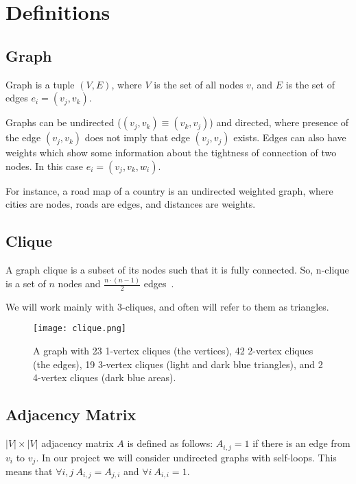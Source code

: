\section{Definitions}

\subsection*{Graph}

Graph is a tuple $\left( V, E \right)$, where $V$ is the set of all nodes $v$, and $E$ is the set of edges $e_i = (v_j, v_k)$.

Graphs can be undirected ($(v_j, v_k) \equiv (v_k, v_j)$) and directed, where presence of the edge $(v_j, v_k)$ does not imply that edge $(v_j, v_j)$ exists.
Edges can also have weights which show some information about the tightness of connection of two nodes.
In this case $e_i = (v_j, v_k, w_i)$.

For instance, a road map of a country is an undirected weighted graph, where cities are nodes, roads are edges, and distances are weights.


\subsection*{Clique}

A graph clique is a subset of its nodes such that it is fully connected.
So, n-clique is a set of $n$ nodes and $\frac{n \cdot (n - 1)}{2}$ edges~\cite{wiki_clique}.

We will work mainly with 3-cliques, and often will refer to them as triangles.

\begin{figure}[H]
	\centering
	\texttt{[image: clique.png]}
	\caption{A graph with 23 1-vertex cliques (the vertices), 42 2-vertex cliques (the edges), 19 3-vertex cliques (light and dark blue triangles), and 2 4-vertex cliques (dark blue areas).}
\end{figure}


\subsection*{Adjacency Matrix}

$\lvert V \rvert \times \lvert V \rvert$ adjacency matrix $A$ is defined as follows: $A_{i, j} = 1$ if there is an edge from $v_i$ to $v_j$.
In our project we will consider undirected graphs with self-loops.
This means that $\forall i, j\ A_{i, j} = A_{j, i}$ and $\forall i\ A_{i, i} = 1$.


